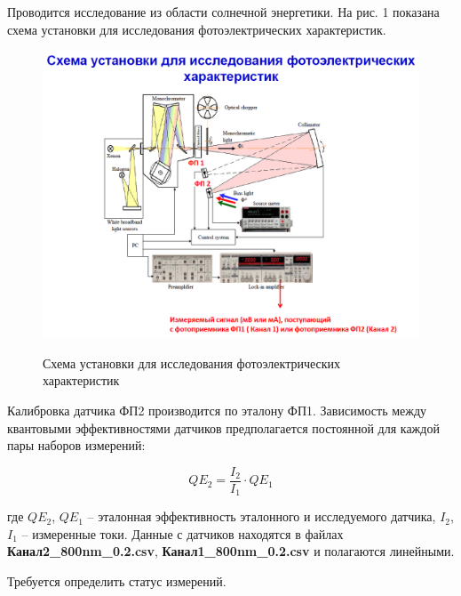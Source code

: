 Проводится исследование из области солнечной энергетики. На рис. 1 показана схема установки для исследования фотоэлектрических характеристик.

\begin{figure}[H]
	\begin{center}
		\includegraphics[scale=0.8]{problem1}
		\label{pic:problem1}
		\caption{Схема установки для исследования фотоэлектрических характеристик}
	\end{center}
\end{figure}

Калибровка датчика ФП2 производится по эталону ФП1. Зависимость между квантовыми эффективностями датчиков предполагается постоянной для каждой пары наборов измерений:

\begin{equation}
	QE_2 = \frac{I_2}{I_1} \cdot QE_1
\end{equation}

где $QE_2$, $QE_1$ -- эталонная эффективность эталонного и исследуемого датчика, $I_2$, $I_1$ -- измеренные токи. Данные с датчиков находятся в файлах \textbf{Канал2\_800nm\_0.2.csv}, \textbf{Канал1\_800nm\_0.2.csv} и полагаются линейными.

Требуется определить статус измерений.